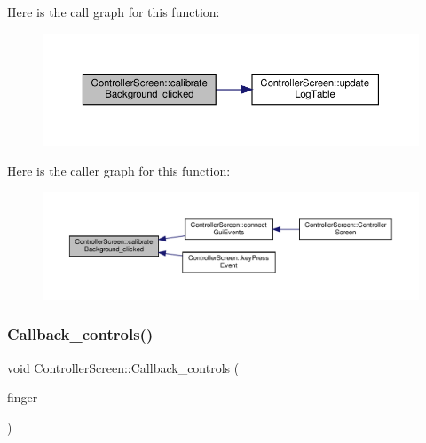 Here is the call graph for this function\+:
\nopagebreak
\begin{figure}[H]
\begin{center}
\leavevmode
\includegraphics[width=350pt]{class_controller_screen_a7a71b9bc26a3de704f8613f3f2a08fb7_cgraph}
\end{center}
\end{figure}
Here is the caller graph for this function\+:
\nopagebreak
\begin{figure}[H]
\begin{center}
\leavevmode
\includegraphics[width=350pt]{class_controller_screen_a7a71b9bc26a3de704f8613f3f2a08fb7_icgraph}
\end{center}
\end{figure}
\mbox{\label{class_controller_screen_a54062624a4a89d8bf392ab5fa66ac5ff}} 
\subsubsection{\texorpdfstring{Callback\+\_\+controls()}{Callback\_controls()}}
{\footnotesize\ttfamily void Controller\+Screen\+::\+Callback\+\_\+controls (\begin{DoxyParamCaption}\item[{\hyperlink{class_gesture_detection_1_1_finger_and_coordinates}{Finger\+And\+Coordinates}}]{finger }\end{DoxyParamCaption})}

\mbox{\label{class_controller_screen_acf89cc74ff8383884d11a067b3243d4a}} 
